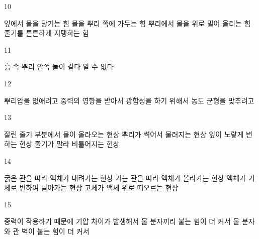 \documentclass[fs9,seriesRus]{korfarm-base}
\begin{document}
\begin{kfSentenceUnit}{10}{}
\begin{kfChoices}
\kfChoice 잎에서 물을 당기는 힘
\kfChoice 물을 뿌리 쪽에 가두는 힘
\kfChoice 뿌리에서 물을 위로 밀어 올리는 힘
\kfChoice 줄기를 튼튼하게 지탱하는 힘
\end{kfChoices}
\end{kfSentenceUnit}

\begin{kfSentenceUnit}{11}{}
\begin{kfChoices}
\kfChoice 흙 속
\kfChoice 뿌리 안쪽
\kfChoice 둘이 같다
\kfChoice 알 수 없다
\end{kfChoices}
\end{kfSentenceUnit}

\begin{kfSentenceUnit}{12}{}
\begin{kfChoices}
\kfChoice 뿌리압을 없애려고
\kfChoice 중력의 영향을 받아서
\kfChoice 광합성을 하기 위해서
\kfChoice 농도 균형을 맞추려고
\end{kfChoices}
\end{kfSentenceUnit}

\begin{kfSentenceUnit}{13}{}
\begin{kfChoices}
\kfChoice 잘린 줄기 부분에서 물이 올라오는 현상
\kfChoice 뿌리가 썩어서 물러지는 현상
\kfChoice 잎이 노랗게 변하는 현상
\kfChoice 줄기가 말라 비틀어지는 현상
\end{kfChoices}
\end{kfSentenceUnit}

\begin{kfSentenceUnit}{14}{}
\begin{kfChoices}
\kfChoice 굵은 관을 따라 액체가 내려가는 현상
\kfChoice 가는 관을 따라 액체가 올라가는 현상
\kfChoice 액체가 기체로 변하여 날아가는 현상
\kfChoice 고체가 액체 위로 떠오르는 현상
\end{kfChoices}
\end{kfSentenceUnit}

\begin{kfSentenceUnit}{15}{}
\begin{kfChoices}
\kfChoice 중력이 작용하기 때문에
\kfChoice 기압 차이가 발생해서
\kfChoice 물 분자끼리 붙는 힘이 더 커서
\kfChoice 물 분자와 관 벽이 붙는 힘이 더 커서
\end{kfChoices}
\end{kfSentenceUnit}
\end{document}
